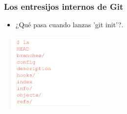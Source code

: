 \documentclass{beamer}
\begin{document}
	\begin{frame}
		\frametitle{Los entresijos internos de Git}
		\begin{itemize}
			\item ¿Qué pasa cuando lanzas 'git init'?.\\
		\end{itemize}
		\begin{center}
			\includegraphics[width=5cm,height=4cm]{imagen4.png}
		\end{center}
	\end{frame}
\end{document}

